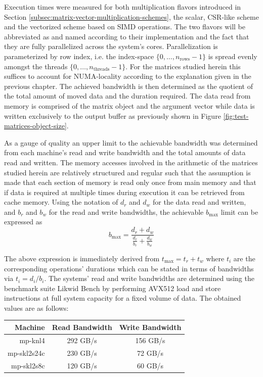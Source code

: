     Execution times were measured for both multiplication flavors introduced in Section
    \ref{subsec:matrix-vector-multiplication-schemes}, the scalar, CSR-like scheme and the vectorized scheme based on
    SIMD operations. The two flavors will be abbreviated as  and  named according to
    their implementation and the fact that they are fully parallelized across the system's cores. Parallelization is
    parameterized by row index, i.e. the index-space $\{0, \ldots, n_{\text{rows}} - 1\}$ is spread evenly amongst the
    threads $\{0, \ldots, n_\text{threads} - 1\}$. For the matrices studied herein this suffices to account for
    NUMA-locality according to the explanation given in the previous chapter. The achieved bandwidth is then determined
    as the quotient of the total amount of moved data and the duration required. The data read from memory is comprised
    of the matrix object and the argument vector while data is written exclusively to the output buffer as previously
    shown in Figure \ref{fig:test-matrices-object-size}.

    As a gauge of quality an upper limit to the achievable bandwidth was determined from each machine's read and write
    bandwidth and the total amounts of data read and written. The memory accesses involved in the arithmetic of the
    matrices studied herein are relatively structured and regular such that the assumption is made that each section of
    memory is read only once from main memory and that if data is required at multiple times during execution it can be
    retrieved from cache memory. Using the notation of $d_r$ and $d_w$ for the data read and written, and $b_r$ and
    $b_w$ for the read and write bandwidths, the achievable $b_\text{max}$ limit can be expressed as
    $$
      b_{\text{max}} = \frac{d_r + d_w}{\frac{d_r}{b_r} + \frac{d_w}{b_w}}
    $$

    The above expression is immediately derived from $t_\text{max} = t_r + t_w$ where $t_i$ are the corresponding
    operations' durations which can be stated in terms of bandwidths via $t_i = d_i / b_i$. The systems' read and write
    bandwidths are determined using the benchmark suite Likwid Bench \cite{likwidbench:github} by performing AVX512 load
    and store instructions at full system capacity for a fixed volume of data. The obtained values are as follows:

    \begin{center}
    \begin{tabular}{r|c|c}
      \textbf{Machine} & \textbf{Read Bandwidth} & \textbf{Write Bandwidth} \\
      \hline
      mp-knl4     & 292 GB/s & 156 GB/s \\
      mp-skl2s24c & 230 GB/s & 72 GB/s  \\
      mp-skl2s8c  & 120 GB/s & 60 GB/s  \\
    \end{tabular}
    \end{center}

